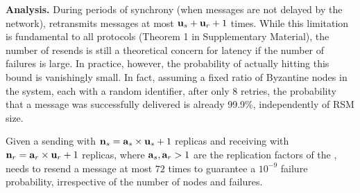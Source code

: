 \par \textbf{Analysis.} 
During periods of synchrony (when messages are not delayed by the network), \Scrooge{} retransmits messages at most $\textbf{u}_{s} + \textbf{u}_{r}+ 1$ times. While this limitation is fundamental to all \CCC{} protocols (Theorem 1 in Supplementary Material), the number of resends is still a theoretical concern for latency if the number of failures is large. 
In practice, however, the probability of actually hitting this bound is vanishingly small. In fact, assuming a fixed ratio of Byzantine nodes in the system, each with a random identifier, after only 8 retries, the probability that a message was successfully delivered is already 99.9\%, independently of RSM size.

\begin{theorem}
 Given a sending \RSM{} with $\textbf{n}_{s}= \textbf{a}_{s} \times \textbf{u}_{s} + 1$ replicas and 
receiving \RSM{} with $\textbf{n}_{r}= \textbf{a}_{r} \times \textbf{u}_{r} + 1$ replicas, where $\textbf{a}_{s}, \textbf{a}_{r} > 1$ are the replication factors of the ,
\Scrooge{} needs to resend a message at most $72$ times to guarantee a $10^{-9}$ failure probability, irrespective of the number of nodes and failures.
\end{theorem}
